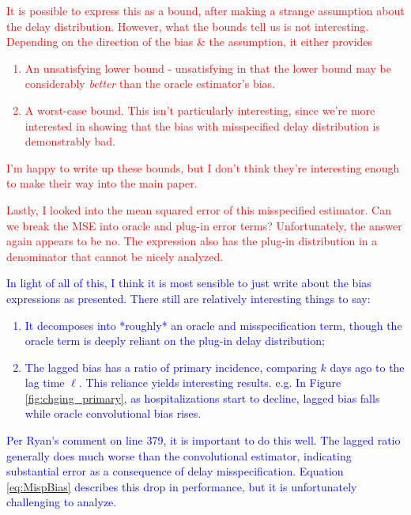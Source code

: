 \documentclass{article}
\begin{document}
\textcolor{red}{It is possible to express this as a bound, after making a strange assumption about the delay distribution. However, what the bounds tell us is not interesting. Depending on the direction of the bias \& the assumption, it either provides 
\begin{enumerate}
    \item An unsatisfying lower bound - unsatisfying in that the lower bound may be considerably \textit{better} than the oracle estimator's bias.
    \item A worst-case bound. This isn't particularly interesting, since we're more interested in showing that the bias with misspecified delay distribution is demonstrably bad.
\end{enumerate}
I'm happy to write up these bounds, but I don't think they're interesting enough to make their way into the main paper.}

\textcolor{red}{Lastly, I looked into the mean squared error of this misspecified estimator. Can we break the MSE into oracle and plug-in error terms? Unfortunately, the answer again appears to be no. The expression also has the plug-in distribution in a denominator that cannot be nicely analyzed.}

\textcolor{blue}{In light of all of this, I think it is most sensible to just write about the bias expressions as presented. There still are relatively interesting things to say:
\begin{enumerate}
    \item It decomposes into *roughly* an oracle and misspecification term, though the oracle term is deeply reliant on the plug-in delay distribution;
    \item The lagged bias has a ratio of primary incidence, comparing $k$ days ago to the lag time $\ell$. This reliance yields interesting results. e.g. In Figure \ref{fig:chging_primary}, as hospitalizations start to decline, lagged bias falls while oracle convolutional bias rises.
\end{enumerate}}

\textcolor{blue}{Per Ryan's comment on line 379, it is important to do this well. The lagged ratio generally does much worse than the convolutional estimator, indicating substantial error as a consequence of delay misspecification. Equation \ref{eq:MispBias} describes this drop in performance, but it is unfortunately challenging to analyze. 
}

\end{document}
